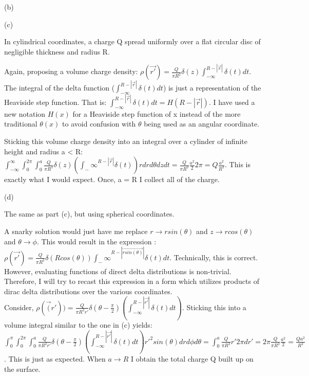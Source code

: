 \begin{homeworkProblem}
\begin{homeworkSection}{(b)}
\end{homeworkSection}

\begin{homeworkSection}{(c)}

In cylindrical coordinates, a charge Q spread uniformly over a flat circular 
disc of negligible thickness and radius R. 

Again, proposing a volume charge density: $\rho(\vec{r'}) = \frac{Q}{\pi R^2} \delta(z) \int_{-\infty}^{R-|\vec{r}|}\delta(t) dt$. The integral of the delta function ($ \int_{-\infty}^{R-|\vec{r}|}\delta(t) dt $) is just a representation of the Heaviside step function. That is: $\int_{-\infty}^{R-|\vec{r}|}\delta(t) dt = H(R-|\vec{r}|)$. I have used a new notation $H(x)$ for a Heaviside step function of x instead of the more traditional $\theta(x)$ to avoid confusion with $\theta$ being used as an angular coordinate.

Sticking this volume charge density into an integral over a cylinder of infinite height and radius a < R: $\int_{-\infty}^\infty \int_0^{2\pi} \int_0^a  \frac{Q}{\pi R^2} \delta(z) (\int_-\infty^{R-|\vec{r}|}\delta(t) ) r dr d\theta dz dt = \frac{Q}{\pi R^2} \frac{a^2}{2} 2\pi = Q \frac{a^2}{R^2}$. This is exactly what I would expect. Once, a = R I collect all of the charge. 

\end{homeworkSection}

\begin{homeworkSection}{(d)}

The same as part (c), but using spherical coordinates.

A snarky solution would just have me replace $r \rightarrow r sin(\theta)$ and $z \rightarrow r cos(\theta)$ and $\theta \rightarrow \phi$. This would result in the expression : $\rho(\vec{r'}) = \frac{Q}{\pi R^2} \delta(R cos(\theta)) \int_-\infty^{R-|\vec{r sin(\theta)}|}\delta(t) dt$. Technically, this is correct. However, evaluating functions of direct delta distributions is non-trivial. Therefore, I will try to recast this expression in a form which utilizes products of dirac delta distributions over the various coordinates.
\\
Consider, $\rho(\vec(r')) = \frac{Q}{\pi R^2 r'} \delta(\theta - \frac{\pi}{2}) (\int_{-\infty}^{R-|\vec{r'}|} \delta(t) dt)$. Sticking this into a volume integral similar to the one in (c) yields: $\int_0^\pi \int_0^{2\pi} \int_0^a \frac{Q}{\pi R^2 r'}\delta(\theta - \frac{\pi}{2}) (\int_{-\infty}^{R-|\vec{r'}|} \delta(t) dt) r'^2 sin(\theta) dr d\phi d\theta = \int_0^a \frac{Q}{\pi R^2} r' 2\pi dr' = 2\pi \frac{Q}{\pi R^2} \frac{a^2}{2} = \frac{Qa^2}{R^2}$. This is just as expected. When $a \rightarrow R$ I obtain the total charge Q built up on the surface. 

\end{homeworkSection}

\end{homeworkProblem}